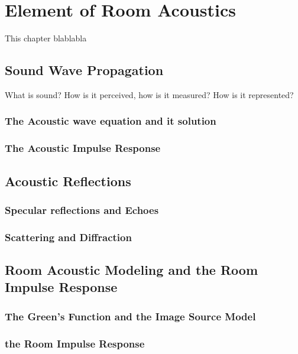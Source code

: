 \chapter{Element of Room Acoustics}\label{chap:acoustics}

 This chapter blablabla

\section{Sound Wave Propagation}
What is sound? How is it perceived, how is it measured? How is it represented?


\subsection{The Acoustic wave equation and it solution}

\subsection{The Acoustic Impulse Response}


\section{Acoustic Reflections}
\subsection{Specular reflections and Echoes}

\subsection{Scattering and Diffraction}

\section{Room Acoustic Modeling and the Room Impulse Response}
\subsection{The Green's Function and the Image Source Model}

\subsection{the Room Impulse Response}

